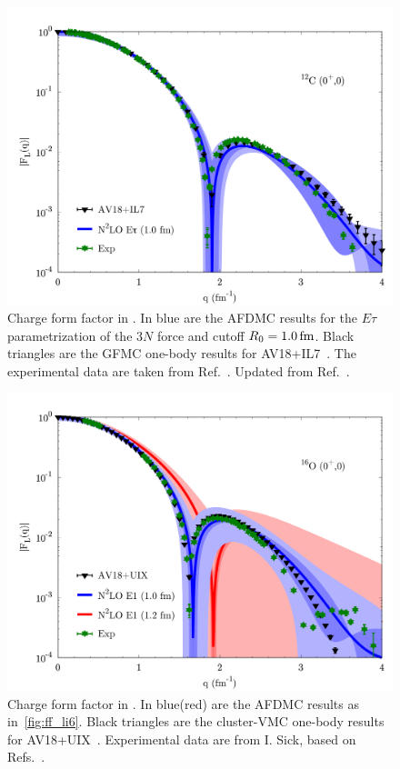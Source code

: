 \documentclass[aps,prc,twocolumn,superscriptaddress,floatfix]{revtex4-1}
\begin{document}
\begin{figure}[htb]
\includegraphics[width=\linewidth]{ff_c12_et.pdf}
\caption[]{Charge form factor in . 
In blue are the AFDMC results for the $E\tau$ parametrization of the $3N$
force and cutoff $R_0=1.0\,\rm fm$.
Black triangles are the GFMC one-body results for AV18+IL7~\cite{Lovato:2013}.
The experimental data are taken from Ref.~\cite{Devries:1987}.
Updated from Ref.~\cite{Lonardoni:2017afdmc}.}
\label{fig:ff_c12}
\end{figure}

\begin{figure}[htb]
\includegraphics[width=\linewidth]{ff_o16_e1.pdf}
\caption[]{Charge form factor in .
In blue(red) are the AFDMC results as in~\cref{fig:ff_li6}.
Black triangles are the cluster-VMC one-body results for AV18+UIX~\cite{Lonardoni:2017cvmc}.
Experimental data are from I. Sick, based on Refs.~\cite{Sick:1970,Schuetz:1975,Sick:1975}.}
\label{fig:ff_o16}
\end{figure}
\end{document}
